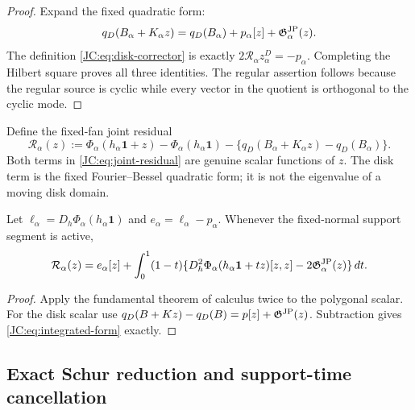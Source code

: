 \begin{proof}
Expand the fixed quadratic form:
\[
 q_D(B_\alpha+K_\alpha z)
 =q_D(B_\alpha)+p_\alpha[z]+\mathfrak G^{\rm JP}_\alpha(z).
\]
The definition \eqref{JC:eq:disk-corrector} is exactly
$2\mathcal R_\alpha z_\alpha^D=-p_\alpha$.  Completing the Hilbert square
proves all three identities.  The regular assertion follows because the
regular source is cyclic while every vector in the quotient is orthogonal
to the cyclic mode.
\end{proof}

Define the fixed-fan joint residual
\begin{equation}\label{JC:eq:joint-residual}
\boxed{
 \mathscr R_\alpha(z):=
 \Phi_\alpha(h_\alpha\mathbf1+z)
 -\Phi_\alpha(h_\alpha\mathbf1)
 -\{q_D(B_\alpha+K_\alpha z)-q_D(B_\alpha)\}.}
\end{equation}
Both terms in \eqref{JC:eq:joint-residual} are genuine scalar functions of
$z$.  The disk term is the fixed Fourier--Bessel quadratic form; it is not
the eigenvalue of a moving disk domain.

\begin{proposition}\label{JC:prop:integrated-form}
Let $\ell_\alpha=D_h\Phi_\alpha(h_\alpha\mathbf1)$ and
$e_\alpha=\ell_\alpha-p_\alpha$.  Whenever the fixed-normal support
segment is active,
\begin{equation}\label{JC:eq:integrated-form}
 \mathcal{R}_\alpha(z)=e_\alpha[z]
 +\int_0^1(1-t)
 \{D_h^2\Phi_\alpha(h_\alpha\mathbf1+tz)[z,z]
       -2\mathfrak G^{\rm JP}_\alpha(z)\}\,dt.
\end{equation}
\end{proposition}

\begin{proof}
Apply the fundamental theorem of calculus twice to the polygonal scalar.
For the disk scalar use
$q_D(B+Kz)-q_D(B)=p[z]+\mathfrak G^{\rm JP}(z)$.  Subtraction gives
\eqref{JC:eq:integrated-form} exactly.
\end{proof}

\subsection{Exact Schur reduction and support-time cancellation}

